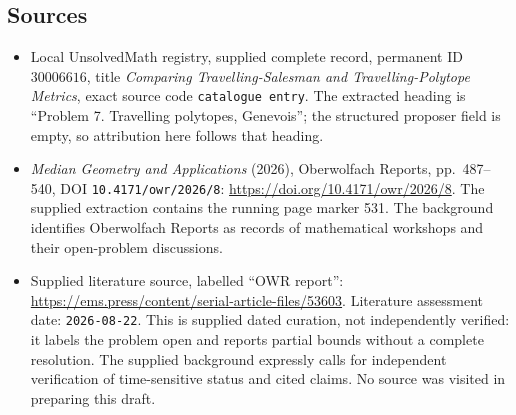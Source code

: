 \documentclass[11pt]{article}
\begin{document}
\subsection{Sources}
\begin{itemize}
\item Local UnsolvedMath registry, supplied complete record, permanent ID \(30006616\), title \emph{Comparing Travelling-Salesman and Travelling-Polytope Metrics}, exact source code \texttt{catalogue entry}. The extracted heading is ``Problem 7. Travelling polytopes, Genevois''; the structured proposer field is empty, so attribution here follows that heading.
\item \emph{Median Geometry and Applications} (2026), Oberwolfach Reports, pp.\ 487--540, DOI \texttt{10.4171/owr/2026/8}: \url{https://doi.org/10.4171/owr/2026/8}. The supplied extraction contains the running page marker 531. The background identifies Oberwolfach Reports as records of mathematical workshops and their open-problem discussions.
\item Supplied literature source, labelled ``OWR report'': \url{https://ems.press/content/serial-article-files/53603}. Literature assessment date: \texttt{2026-08-22}. This is supplied dated curation, not independently verified: it labels the problem open and reports partial bounds without a complete resolution. The supplied background expressly calls for independent verification of time-sensitive status and cited claims. No source was visited in preparing this draft.
\end{itemize}
\end{document}
